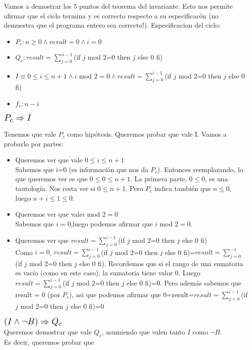\documentclass{article}
\begin{document}
Vamos  a demostrar los 5 puntos del teorema del invariante. Esto nos permite afirmar que el ciclo termina y es correcto
	 respecto a su especificacón (no demuestra que el programa entero sea correcto!). Especificacion del ciclo:
	\begin{itemize}
		\item $P_c: n\geq 0\wedge result=0 \wedge i=0$
		\item $Q_c:result=\sum_{j=0}^{n-1} $(if $j$ mod 2=0 then $j$ else 0 fi)
		\item $I\equiv 0\leq i\leq n+1\wedge i \textrm{ mod }2=0 \wedge result=\sum_{j=0}^{i-1}$(if $j$ mod 2=0 then $j$ else 0 fi)
		\item $f_v:n-i$
	\end{itemize}
	\begin{flushleft}$\scalebox{1.3}{$P_c\Rightarrow I$}$\end{flushleft}
	Tenemos que vale $P_c$ como hipótesis. Queremos probar que vale I. Vamos a probarlo por partes:
	\begin{itemize}
		\item Queremos ver que vale $ 0\leq i\leq n+1$\smallskip \\
		Sabemos que i=0 (es información que nos da $P_c$). Entonces reemplazando, lo que queremos ver es que 
		$0\leq 0\leq n+1$. La primera parte, $0\leq 0$, es una tautología. Nos resta ver si $0\leq n+1$. Pero $P_c$
		indica también que $n\leq 0$, luego $n+i\leq 1\leq 0$.
		\item Queremos ver que vale$i$ mod $2=0$\\
		Sabemos que $i=0$,luego podemos afirmar que $i$ mod $2=0$.
		\item Queremos ver que $result=\sum_{j=0}^{i-1}$(if $j$ mod 2=0 then $j$ else 0 fi)\\
		Como $i=0$, $result=\sum_{j=0}^{i-1}$(if $j$ mod 2=0 then $j$ else 0 fi)=$result=\sum_{j=0}^{-1}$(if $j$ mod 2=0 then $j$ else 0 fi).
		 Recordemos que si el rango de una sumatoria es vacío (como en este caso), la sumatoria tiene valor 0. Luego 
		 $result=\sum_{j=0}^{i-1}$(if $j$ mod 2=0 then $j$ else 0 fi)=0. Pero además sabemos que result = 0 (por $P_c$), asi que podemos
		  afirmar que 0=result=$result=\sum_{j=0}^{i-1}$(if $j$ mod 2=0 then $j$ else 0 fi)=0
	\end{itemize}	 
	$\scalebox{1.3}{$(I\wedge \neg B)\Rightarrow Q_c$}$\smallskip \\
	Queremos demostrar que vale $Q_c$, asumiendo que valen tanto $I$ como $\neg B$.\\ Es decir, queremos probar que 
\end{document}
